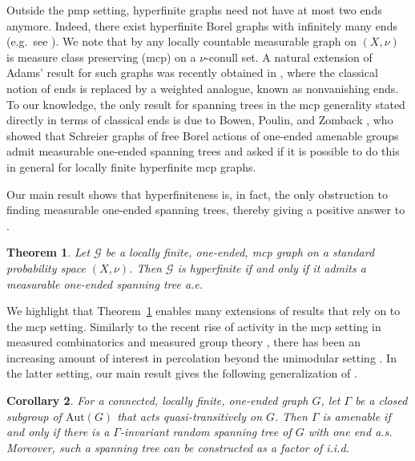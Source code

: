 \documentclass[letterpaper,11pt,reqno]{amsart}
\theoremstyle{bfnote}
\newtheorem{theorem}{Theorem}[section]
\newtheorem{cor}[theorem]{Corollary}
\theoremstyle{definition}
\newcommand{\0}{\varnothing}
\newcommand{\Aut}{\mathrm{Aut}}
\numberwithin{equation}{section}
\begin{document}
Outside the pmp setting, hyperfinite graphs need not have at most two ends anymore. Indeed, there exist hyperfinite Borel graphs with infinitely many ends (e.g.\ see \cite[Example 1.2]{CTT22}). 
We note that by \cite[Proposition 2.1]{Miller:thesis} any locally countable measurable graph on $(X,\nu)$ is measure class preserving (mcp) on a $\nu$-conull set. 
A natural extension of Adams’ result for such graphs was recently obtained in \cite{AnushRobin}, where the classical notion of ends is replaced by a weighted analogue, known as nonvanishing ends. 
To our knowledge, the only result for spanning trees in the mcp generality stated directly in terms of classical ends is due to Bowen, Poulin, and Zomback \cite{bowen2022one}, who showed that Schreier graphs of free Borel actions of one-ended amenable groups admit measurable one-ended spanning trees and asked if it is possible to do this in general for locally finite hyperfinite mcp graphs. 

Our main result shows that hyperfiniteness is, in fact, the only obstruction to finding measurable one-ended spanning trees, thereby giving a positive answer to \cite[Question 1]{bowen2022one}.  


\begin{theorem}\label{measure_main}
    Let $\mathcal{G}$ be a locally finite, one-ended, mcp graph on a standard probability space $(X,\nu)$. Then $\mathcal{G}$ is hyperfinite if and only if it admits a measurable one-ended spanning tree a.e.
\end{theorem}

We highlight that Theorem~\ref{measure_main} enables many extensions of results that rely on \cite{Timar_oneended,cgmtd} to the mcp setting. 
Similarly to the recent rise of activity in the mcp setting in measured combinatorics and measured group theory \cite{Ts:hyperfinite_ergodic_subgraph,AnushRobin, bowen2022one, CTT22, poulin-anticost, OscillatingEnd}, there has been an increasing amount of interest in percolation beyond the unimodular setting \cite{Hutchcroft20,CTT22,HutchcroftPan24dim,wamen,HeavyClusterRepulsion}. In the latter setting, our main result gives the following generalization of \cite[Corollary 1.2]{Timar_oneended}.  


\begin{cor}\label{perc_mian}
    For a connected, locally finite, one-ended graph $G$, let $\Gamma$ be a closed subgroup of $\Aut(G)$ that acts quasi-transitively on $G$. Then $\Gamma$ is amenable if and only if there is a $\Gamma$-invariant random spanning tree of $G$ with one end a.s. 
    Moreover, such a spanning tree can be constructed as a factor of i.i.d.
\end{cor}
\end{document}
